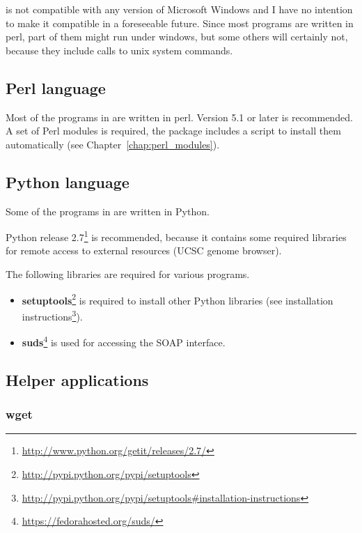 \documentclass[12pt,a4paper, oneside]{scrreprt} %
\begin{document}
\RSAT is not compatible with any version of Microsoft Windows and I
have no intention to make it compatible in a foreseeable future. Since
most programs are written in perl, part of them might run under
windows, but some others will certainly not, because they include
calls to unix system commands.

\subsection{Perl language}

Most of the programs in \RSAT are written in perl. Version 5.1 or
later is recommended. A set of Perl modules is required, the \RSAT
package includes a script to install them automatically (see
Chapter~\ref{chap:perl_modules}).

\subsection{Python language}

Some of the programs in \RSAT are written in Python. 

Python release
2.7\footnote{\url{http://www.python.org/getit/releases/2.7/}} is
recommended, because it contains some required libraries for remote
access to external resources (UCSC genome browser).

The following libraries are required for various programs.



\begin{itemize}
\item
  \textbf{setuptools}\footnote{\url{http://pypi.python.org/pypi/setuptools}}
  is required to install other Python libraries (see installation
  instructions\footnote{\url{http://pypi.python.org/pypi/setuptools\#installation-instructions}}).

\item \textbf{suds}\footnote{\url{https://fedorahosted.org/suds/}} is
  used for accessing the SOAP interface.

\end{itemize}


\subsection{Helper applications}



\subsubsection{wget}
\end{document}

